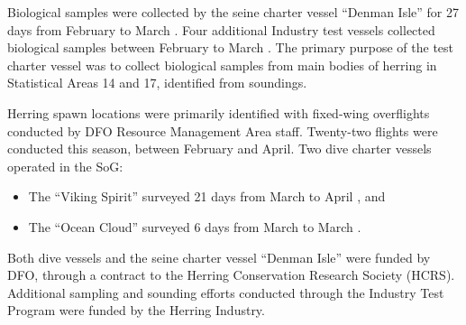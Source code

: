 Biological samples were collected by the seine charter vessel ``Denman Isle'' for 27 days from February  to March .
Four additional Industry test vessels collected biological samples between February  to March .
The primary purpose of the test charter vessel was to collect biological samples from main bodies of herring in Statistical Areas 14 and 17, identiﬁed from soundings.

Herring spawn locations were primarily identiﬁed with ﬁxed-wing overﬂights conducted by DFO Resource Management Area staff.
Twenty-two ﬂights were conducted this season, between February and April.
Two dive charter vessels operated in the SoG:
\begin{itemize}
\item The ``Viking Spirit'' surveyed 21 days from March  to April , and
\item The ``Ocean Cloud'' surveyed 6 days from March  to March .
\end{itemize}
Both dive vessels and the seine charter vessel ``Denman Isle'' were funded by DFO, through a contract to the Herring Conservation Research Society (HCRS).
Additional sampling and sounding efforts conducted through the Industry Test Program were funded by the Herring Industry.